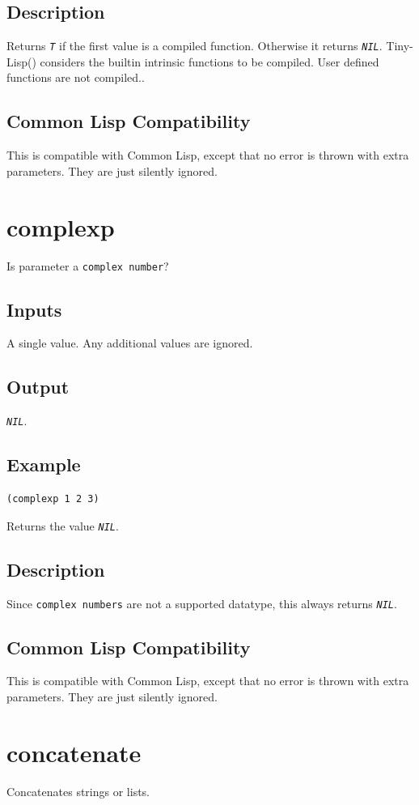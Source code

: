 \documentclass[10pt, openany]{book}
\newcommand{\constant}[1]{\emph{\texttt{#1}}}
\newcommand{\datatype}[1]{\texttt{#1}}
\newcommand{\tl}{Tiny-Lisp}
\newcommand{\cl}{Common Lisp}
\begin{document}
\subsection{Description}
Returns \constant{T} if the first value is a compiled function.  Otherwise it returns \constant{NIL}.  \tl() considers the builtin intrinsic functions to be compiled.  User defined functions are not compiled..
\subsection{Common Lisp Compatibility}
This is compatible with \cl, except that no error is thrown with extra parameters.  They are just silently ignored.

\section{complexp}
Is parameter a \datatype{complex number}?
\subsection{Inputs}
A single value.  Any additional values are ignored.
\subsection{Output}
\constant{NIL}.
\subsection{Example}
\begin{lstlisting}
(complexp 1 2 3)
\end{lstlisting}
Returns the value \constant{NIL}.
\subsection{Description}
Since \datatype{complex numbers} are not a supported datatype, this always returns \constant{NIL}.
\subsection{Common Lisp Compatibility}
This is compatible with \cl, except that no error is thrown with extra parameters.  They are just silently ignored.

\section{concatenate}
Concatenates strings or lists.
\end{document}
